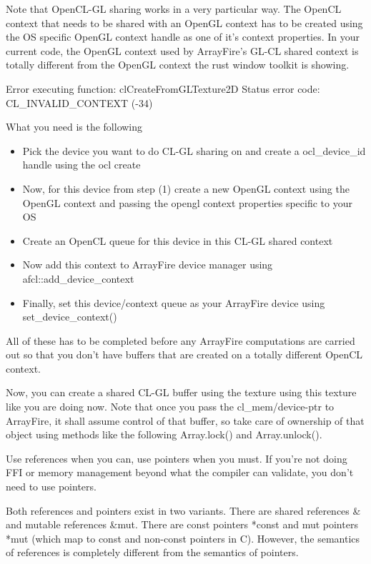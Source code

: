 Note that OpenCL-GL sharing works in a very particular way. The OpenCL context that needs to be shared with an OpenGL context has to be created using the OS specific OpenGL context handle as one of it's context properties. In your current code, the OpenGL context used by ArrayFire's GL-CL shared context is totally different from the OpenGL context the rust window toolkit is showing.

Error executing function: clCreateFromGLTexture2D  
Status error code: CL_INVALID_CONTEXT (-34)  

What you need is the following


\begin{itemize}
\item Pick the device you want to do CL-GL sharing on and create a ocl_device_id handle using the ocl create
\item Now, for this device from step (1) create a new OpenGL context using the OpenGL context and passing the opengl context properties specific to your OS
\item Create an OpenCL queue for this device in this CL-GL shared context
\item Now add this context to ArrayFire device manager using afcl::add_device_context 
\item Finally, set this device/context queue as your ArrayFire device using set_device_context()
\end{itemize}

All of these has to be completed before any ArrayFire computations are carried out so that you don't have buffers that are created on a totally different OpenCL context.

Now, you can create a shared CL-GL buffer using the texture using this texture like you are doing now. Note that once you pass the cl_mem/device-ptr to ArrayFire, it shall assume control of that buffer, so take care of ownership of that object using methods like the following
Array.lock() and Array.unlock().

Use references when you can, use pointers when you must. If you're not doing FFI or memory management beyond what the compiler can validate, you don't need to use pointers.

Both references and pointers exist in two variants. There are shared references \& and mutable references \&mut. There are const pointers *const and mut pointers *mut (which map to const and non-const pointers in C). However, the semantics of references is completely different from the semantics of pointers.

